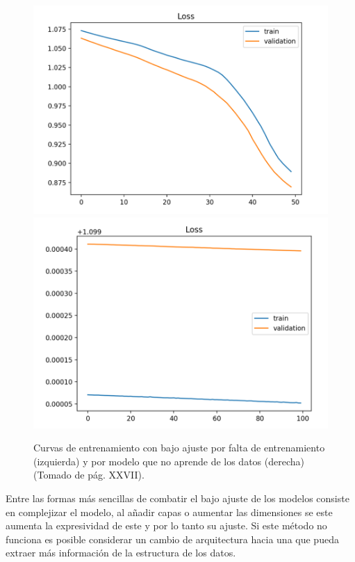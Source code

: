 \begin{figure}[h!]
	\begin{center}
		\includegraphics[scale=.2]{Graphics/underfit_missing_training.png}
		\includegraphics[scale=.2]{Graphics/underfit_not_learning.png}
		\caption{Curvas de entrenamiento con bajo ajuste por falta de entrenamiento (izquierda) 
		y por modelo que no aprende de los datos (derecha) (Tomado de \cite{brownlee2018better} pág. XXVII).}\label{fig:underfit}
	\end{center}
\end{figure}

Entre las formas más sencillas de combatir el bajo ajuste de los modelos consiste en complejizar el modelo, al añadir
capas o aumentar las dimensiones se este aumenta la expresividad de este y por lo tanto su ajuste. Si este método 
no funciona es posible considerar un cambio de arquitectura hacia una que pueda extraer más información de la 
estructura de los datos. 


